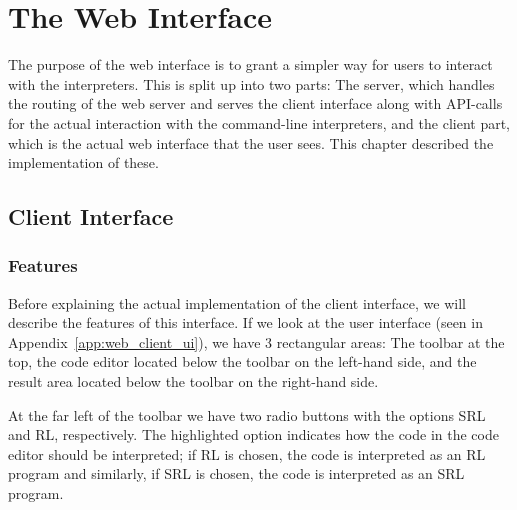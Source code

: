 
\section{The Web Interface}

The purpose of the web interface is to grant a simpler way for users to interact with the interpreters.
This is split up into two parts:
The server, which handles the routing of the web server and serves the client interface along with API-calls for the actual interaction with the command-line interpreters, and the client part, which is the actual web interface that the user sees.
This chapter described the implementation of these.

\subsection{Client Interface}
\label{sec:implementation_web_client}


\subsubsection{Features}

Before explaining the actual implementation of the client interface, we will describe the features of this interface.
If we look at the user interface (seen in Appendix~\ref{app:web_client_ui}), we have 3 rectangular areas: The toolbar at the top, the code editor located below the toolbar on the left-hand side, and the result area located below the toolbar on the right-hand side.


At the far left of the toolbar we have two radio buttons with the options SRL and RL, respectively. The highlighted option indicates how the code in the code editor should be interpreted; if RL is chosen, the code is interpreted as an RL program and similarly, if SRL is chosen, the code is interpreted as an SRL program.

